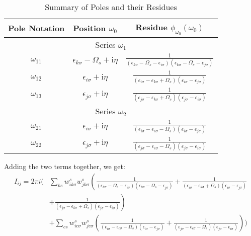 \documentclass[12pt]{article}
\begin{document}
\begin{table}[h]
\centering
\caption{Summary of Poles and their Residues}
\begin{tabular}{|c|c|c|}
\hline
Pole Notation & Position $\omega_0$ & Residue $\phi_{\omega_0}(\omega_0)$ \\
\hline
\multicolumn{3}{|c|}{Series $\omega_1$} \\
\hline
$\omega_{11}$ & $\epsilon_{k \sigma} - \Omega_s + \mathrm{i} \eta$ & $\frac{1}{(\epsilon_{k \sigma} - \Omega_s -\epsilon_{i \sigma})(\epsilon_{k \sigma} - \Omega_s -\epsilon_{j \sigma})}$ \\
$\omega_{12}$ & $\epsilon_{i \sigma} + \mathrm{i} \eta$ & $\frac{1}{(\epsilon_{i \sigma} -\epsilon_{k \sigma}+\Omega_s)(\epsilon_{i \sigma} -\epsilon_{j \sigma})}$ \\
$\omega_{13}$ & $\epsilon_{j \sigma} + \mathrm{i} \eta$ & $\frac{1}{(\epsilon_{j \sigma} -\epsilon_{k \sigma}+\Omega_s)(\epsilon_{j \sigma} -\epsilon_{i \sigma})}$ \\
\hline
\multicolumn{3}{|c|}{Series $\omega_2$} \\
\hline
$\omega_{21}$ & $\epsilon_{i \sigma} + \mathrm{i} \eta$ & $\frac{1}{(\epsilon_{i \sigma} -\epsilon_{c \sigma}-\Omega_s)(\epsilon_{i \sigma} -\epsilon_{j \sigma})}$ \\
$\omega_{22}$ & $\epsilon_{j \sigma} + \mathrm{i} \eta$ & $\frac{1}{(\epsilon_{j \sigma} -\epsilon_{c \sigma}-\Omega_s)(\epsilon_{j \sigma} -\epsilon_{i \sigma})}$ \\
\hline
\end{tabular}
\end{table}
Adding the two terms together, we get:
\begin{equation}
\begin{aligned}
I_{ij} = 2\pi i \Bigg( & \sum_{ks} w_{i k \sigma}^s w_{j k \sigma}^s \left( \frac{1}{(\epsilon_{k \sigma} - \Omega_s - \epsilon_{i \sigma})(\epsilon_{k \sigma} - \Omega_s - \epsilon_{j \sigma})} + \frac{1}{(\epsilon_{i \sigma} - \epsilon_{k \sigma} + \Omega_s)(\epsilon_{i \sigma} - \epsilon_{j \sigma})} \right. \\
& \left. + \frac{1}{(\epsilon_{j \sigma} - \epsilon_{k \sigma} + \Omega_s)(\epsilon_{j \sigma} - \epsilon_{i \sigma})} \right) \\
& + \sum_{cs} w_{i c \sigma}^s w_{j c \sigma}^s \left( \frac{1}{(\epsilon_{i \sigma} - \epsilon_{c \sigma} - \Omega_s)(\epsilon_{i \sigma} - \epsilon_{j \sigma})} + \frac{1}{(\epsilon_{j \sigma} - \epsilon_{c \sigma} - \Omega_s)(\epsilon_{j \sigma} - \epsilon_{i \sigma})} \right) \Bigg)
\end{aligned}
\end{equation}
\end{document}

